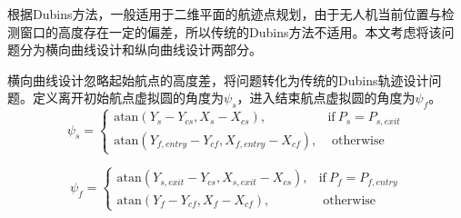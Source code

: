 根据Dubins方法，一般适用于二维平面的航迹点规划，由于无人机当前位置与检测窗口的高度存在一定的偏差，所以传统的Dubins方法不适用。本文考虑将该问题分为横向曲线设计和纵向曲线设计两部分。

横向曲线设计忽略起始航点的高度差，将问题转化为传统的Dubins轨迹设计问题。定义离开初始航点虚拟圆的角度为$\psi_s$，进入结束航点虚拟圆的角度为$\psi_f$。
\begin{equation}
\psi_s = \left\{ \begin{array}{ll}
\text{atan}(Y_s - Y_{cs}, X_s-X_{cs}) ,&\mbox{if}\ P_s =P_{s,exit} \\
\text{atan}(Y_{f,entry} - Y_{cf}, X_{f,entry}-X_{cf}) ,&\mbox{ otherwise}
\end{array} \right.
\end{equation}

\begin{equation}
\psi_f = \left\{ \begin{array}{ll}
\text{atan}(Y_{s,exit} - Y_{cs}, X_{s,exit}  -X_{cs}) ,& \text{if}\ P_f = P_{f,entry}\\
\text{atan}(Y_{f} - Y_{cf}, X_{f}-X_{cf}) ,&\mbox{ otherwise}
\end{array} \right.
\end{equation}

